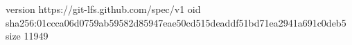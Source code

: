 version https://git-lfs.github.com/spec/v1
oid sha256:01ccca06d0759ab59582d85947eae50cd515deaddf51bd71ea2941a691c0deb5
size 11949
